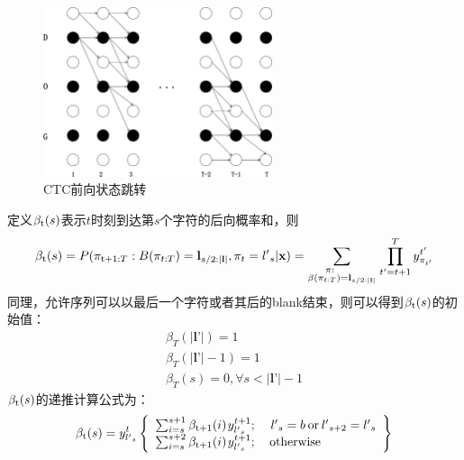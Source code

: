 \begin{figure}[htbp]
\centering
\includegraphics[width=0.6\textwidth]{figures/chapter4/forback-crop}
\caption{CTC前向状态跳转}
\label{fig:ctcforback}
\end{figure}

定义${\beta _{\rm{t}}}(s)$表示$t$时刻到达第$s$个字符的后向概率和，则
\begin{equation}
{\beta _{\rm{t}}}(s) = P({\pi _{{\rm{t}} + 1:T}}:B({\pi _{t:T}}) = {{\textbf{l}}_{s/2:{\rm{|}}{\textbf{l}}|}},{\pi _t} = {{l'}_s}{\rm{|}}{\textbf{x}}{\rm{) = }}\sum\limits_{\scriptstyle{\kern 1pt} {\kern 1pt} {\kern 1pt} {\kern 1pt} {\kern 1pt} {\kern 1pt} {\kern 1pt} {\kern 1pt} {\kern 1pt} {\kern 1pt} {\kern 1pt} {\kern 1pt} {\kern 1pt} {\kern 1pt} \pi :\hfill\atop
\scriptstyle\beta ({\pi _{t:T}}) = {{\textbf{l}}_{s/2:{\rm{|}}{\textbf{l}}|}}\hfill} {\prod\limits_{t' = t + 1}^T {y_{{\pi _{t'}}}^{t'}} }
\end{equation}
同理，允许序列可以以最后一个字符或者其后的blank结束，则可以得到${\beta _{\rm{t}}}(s)$的初始值：
\begin{equation}
\begin{array}{l}
{\beta _T}(|{\textbf{l'}}|) = 1\\
{\beta _T}(|{\textbf{l'}}| - 1) = 1\\
{\beta _T}(s) = 0,\forall s < |{\textbf{l'}}| - 1
\end{array}
\end{equation}
${\beta _{\rm{t}}}(s)$的递推计算公式为：
\begin{equation}
\label{equation:beta}
{\beta _{\rm{t}}}(s) = y_{{{l'}_s}}^t\left\{ \begin{array}{l}
\sum\nolimits_{i = s}^{s + 1} {{\beta _{{\rm{t + 1}}}}(i){\kern 1pt} y_{{{l'}_s}}^{t + 1};} {\kern 1pt} {\kern 1pt} {\kern 1pt} {\kern 1pt} {\kern 1pt} {\kern 1pt} {\kern 1pt} {\kern 1pt} {\kern 1pt} {\kern 1pt} {\kern 1pt} {\kern 1pt} {\kern 1pt} {{l'}_s} = b{\kern 1pt} {\kern 1pt} {\rm{or}}{\kern 1pt} {\kern 1pt} {{l'}_{s + 2}} = {{l'}_s}\\
\sum\nolimits_{i = s}^{s + 2} {{\beta _{{\rm{t + 1}}}}(i){\kern 1pt} y_{{{l'}_s}}^{t + 1};} {\kern 1pt} {\kern 1pt} {\kern 1pt} {\kern 1pt} {\kern 1pt} {\kern 1pt} {\kern 1pt} {\kern 1pt} {\kern 1pt} {\kern 1pt} {\kern 1pt} {\kern 1pt} {\rm{otherwise}}
\end{array} \right\}
\end{equation}


